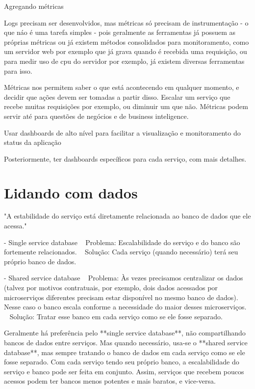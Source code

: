Agregando métricas

Logs precisam ser desenvolvidos, mas métricas só precisam de instrumentação - o que náo é uma tarefa simples - pois geralmente as ferramentas já possuem as próprias métricas ou já existem métodos consolidados para monitoramento, como um servidor web por exemplo que já grava quando é recebida uma requisição, ou para medir uso de cpu do servidor por exemplo, já existem diversas ferramentas para isso.

Métricas nos permitem saber o que está acontecendo em qualquer momento, e decidir que ações devem ser tomadas a partir disso. Escalar um serviço que recebe muitas requisições por exemplo, ou diminuir um que não. Métricas podem servir até para questões de negócios e de business inteligence. 

Usar dashboards de alto nível para facilitar a visualização e monitoramento do status da aplicação

Posteriormente, ter dashboards específicos para cada serviço, com mais detalhes.

\section{Lidando com dados}

"A estabilidade do serviço está diretamente relacionada ao banco de dados que ele acessa."

        - Single service database
            ~ Problema: Escalabilidade do serviço e do banco são fortemente relacionados.
            ~ Solução: Cada serviço (quando necessário) terá seu próprio banco de dados.

        - Shared service database
            ~ Problema: Às vezes precisamos centralizar os dados (talvez por motivos contratuais, por exemplo, dois dados acessados por microserviços diferentes precisam estar disponível no mesmo banco de dados). Nesse caso o banco escala conforme a necessidade do maior desses microserviços.
            ~ Solução: Tratar esse banco em cada serviço como se ele fosse separado.

        Geralmente há preferência pelo **single service database**, não compartilhando bancos de dados entre serviços. Mas quando necessário, usa-se o **shared service database**, mas sempre tratando o banco de dados em cada serviço como se ele fosse separado.
        Com cada serviço tendo seu próprio banco, a escalabilidade do serviço e banco pode ser feita em conjunto. Assim, serviços que recebem poucos acessos podem ter bancos menos potentes e mais baratos, e vice-versa.

